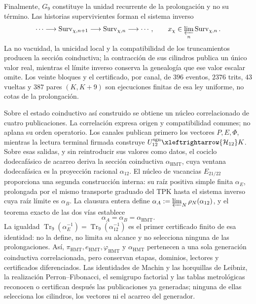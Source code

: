 Finalmente, \(G_9\) constituye la unidad recurrente de la prolongación y no
su término. Las historias supervivientes forman el sistema inverso
\[
 \cdots\longrightarrow\operatorname{Surv}_{\chi,n+1}
 \longrightarrow\operatorname{Surv}_{\chi,n}\longrightarrow\cdots,
 \qquad
 x_\chi\in\varprojlim_n\operatorname{Surv}_{\chi,n}.
\]
La no vacuidad, la unicidad local y la compatibilidad de los truncamientos
producen la sección coinductiva; la contracción de sus cilindros publica un
único valor real, mientras el límite inverso conserva la genealogía que ese
valor escalar omite. Los veinte bloques y el certificado, por canal, de
\(396\) eventos, \(2376\) trits, \(43\) vueltas y \(387\) pares
\((K,K+9)\) son ejecuciones
finitas de esa ley uniforme, no cotas de la prolongación.

Sobre el estado coinductivo así construido se obtiene un núcleo correlacionado de
cuatro publicaciones. La correlación
expresa origen y compatibilidad comunes; no aplana su orden operatorio. Los
canales publican primero los vectores \(P,E,\Phi\), mientras la lectura
terminal firmada construye
\(U_{12}^{\rm sgn}\xleftrightarrow{\mathcal H_{12}}K\). Sobre esas salidas, y
sin reintroducir sus valores como datos, el cociclo dodecafásico de acarreo
deriva la sección coinductiva \(\alpha_{\mathrm{HMT}}\), cuya ventana
dodecafásica es la proyección racional \(\alpha_{12}\). El núcleo de
vacancias \(E_{21/22}\) proporciona una segunda construcción interna: su
raíz positiva simple finita \(\alpha_E\), prolongada por el mismo transporte
graduado del TPK hasta el sistema inverso cuya raíz límite es
\(\alpha_B\). La clausura entera define
\(\alpha_A:=\varprojlim_N\rho_N(\alpha_{12})\), y el teorema exacto de las
dos vías establece
\[
 \boxed{\alpha_A=\alpha_B=\alpha_{\mathrm{HMT}}}.
\]
La igualdad
\(\operatorname{Tr}_9(\alpha_E^{-1})=
\operatorname{Tr}_9(\alpha_{12}^{-1})\) es el primer certificado finito de
esa identidad: no la define, no limita su alcance y no selecciona ninguna de
las prolongaciones. Así,
\(\pi_{\mathrm{HMT}},e_{\mathrm{HMT}},\varphi_{\mathrm{HMT}}\) y
\(\alpha_{\mathrm{HMT}}\) pertenecen a una sola generación coinductiva correlacionada,
pero conservan etapas, dominios, lectores y certificados diferenciados. Las
identidades de Machin y las horquillas de Leibniz, la realización
Perron--Fibonacci, el semigrupo factorial y las tablas metrológicas reconocen
o certifican después las publicaciones ya generadas; ninguna de ellas
selecciona los cilindros, los vectores ni el acarreo del generador.

